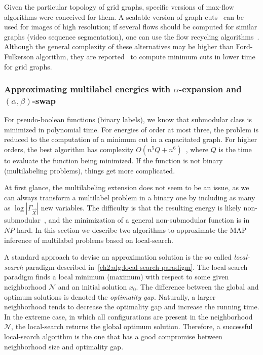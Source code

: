 Given the particular topology of grid graphs, specific versions of max-flow algorithms were conceived for them. A scalable version of graph cuts~\cite{delong08scalable} can be used for images of high resolution; if several flows should be computed for similar graphs (video sequence segmentation), one can use the flow recycling algorithms~\cite{kohli05efficiently,juan06active}. Although the general complexity of these alternatives may be higher than Ford-Fulkerson algorithm, they are reported~\cite{szeliski06comparative} to compute minimum cuts in lower time for grid graphs.


\subsubsection{Approximating multilabel energies with $\alpha$-expansion and $(\alpha,\beta)$-swap}

For pseudo-boolean functions (binary labels), we know that submodular class is minimized in polynomial time. For energies of order at most three, the problem is reduced to the computation of a minimum cut in a capacitated graph. For higher orders, the best algorithm has complexity $O(n^5Q + n^6)$~\cite{orlin09faster}, where $Q$ is the time to evaluate the function being minimized. If the function is not binary (multilabeling problems), things get more complicated.

At first glance, the multilabeling extension does not seem to be an issue, as we can always transform a multilabel problem in a binary one by including as many as $\log |\Gamma_{\vec{X}}|$ new variables. The difficulty is that the resulting energy is likely  non-submodular~\cite{ramalingam08}, and the minimization of a general non-submodular function is in $NP$-hard. In this section we describe two algorithms to approximate the MAP inference of multilabel problems based on local-search.

A standard approach to devise an approximation solution is the so called \emph{local-search} paradigm described in~\cref{ch2:alg:local-search-paradigm}. The local-search paradigm finds a local minimum (maximum) with respect to some given neighborhood $\mathcal{N}$ and an initial solution $x_0$. The difference between the global and optimum solutions is denoted the \emph{optimality gap}. Naturally, a larger neighborhood tends to decrease the optimality gap and increase the running time. In the extreme case, in which all configurations are present in the neighborhood $\mathcal{N}$, the local-search returns the global optimum solution. Therefore, a successful local-search algorithm is the one that has a good compromise between neighborhood size and optimality gap.

